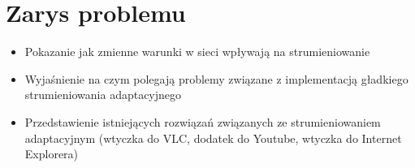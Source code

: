 \chapter{Zarys problemu}
\label{cha:rozdzial2}

\begin{itemize}
\item Pokazanie jak zmienne warunki w sieci wpływają na strumieniowanie
\item Wyjaśnienie na czym polegają problemy związane z implementacją gładkiego strumieniowania adaptacyjnego
\item Przedstawienie istniejących rozwiązań związanych ze strumieniowaniem adaptacyjnym (wtyczka do VLC, dodatek do Youtube, wtyczka do Internet Explorera)
\end{itemize}
